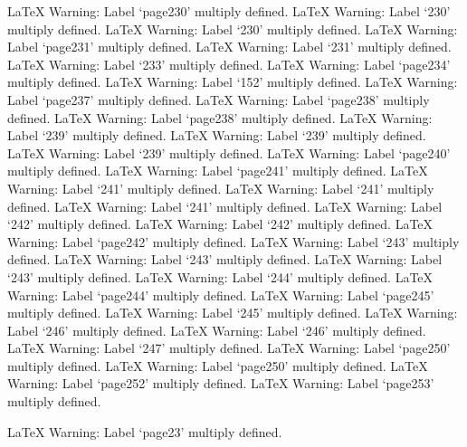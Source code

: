 LaTeX Warning: Label `page230' multiply defined.
LaTeX Warning: Label `230' multiply defined.
LaTeX Warning: Label `230' multiply defined.
LaTeX Warning: Label `page231' multiply defined.
LaTeX Warning: Label `231' multiply defined.
LaTeX Warning: Label `233' multiply defined.
LaTeX Warning: Label `page234' multiply defined.
LaTeX Warning: Label `152' multiply defined.
LaTeX Warning: Label `page237' multiply defined.
LaTeX Warning: Label `page238' multiply defined.
LaTeX Warning: Label `page238' multiply defined.
LaTeX Warning: Label `239' multiply defined.
LaTeX Warning: Label `239' multiply defined.
LaTeX Warning: Label `239' multiply defined.
LaTeX Warning: Label `page240' multiply defined.
LaTeX Warning: Label `page241' multiply defined.
LaTeX Warning: Label `241' multiply defined.
LaTeX Warning: Label `241' multiply defined.
LaTeX Warning: Label `241' multiply defined.
LaTeX Warning: Label `242' multiply defined.
LaTeX Warning: Label `242' multiply defined.
LaTeX Warning: Label `page242' multiply defined.
LaTeX Warning: Label `243' multiply defined.
LaTeX Warning: Label `243' multiply defined.
LaTeX Warning: Label `243' multiply defined.
LaTeX Warning: Label `244' multiply defined.
LaTeX Warning: Label `page244' multiply defined.
LaTeX Warning: Label `page245' multiply defined.
LaTeX Warning: Label `245' multiply defined.
LaTeX Warning: Label `246' multiply defined.
LaTeX Warning: Label `246' multiply defined.
LaTeX Warning: Label `247' multiply defined.
LaTeX Warning: Label `page250' multiply defined.
LaTeX Warning: Label `page250' multiply defined.
LaTeX Warning: Label `page252' multiply defined.
LaTeX Warning: Label `page253' multiply defined.

LaTeX Warning: Label `page23' multiply defined.

